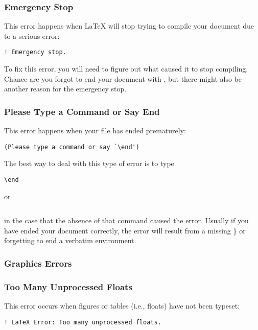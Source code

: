 \subsubsection{Emergency Stop}
\label{sec:emergency-stop}

This error happens when \LaTeX{} will stop trying to compile your
document due to a serious error:
\begin{verbatim}
! Emergency stop.
\end{verbatim}
To fix this error, you will need to figure out what caused it to stop
compiling.  Chance are you forgot to end your document with
\verb||, but there might also be another reason for the
emergency stop.

\subsubsection{Please Type a Command or Say End}
\label{sec:please-type-command}

This error happens when your file has ended prematurely:
\begin{verbatim}
(Please type a command or say `\end')
\end{verbatim}

The best way to deal with this type of error is to type
\begin{verbatim}
\end
\end{verbatim}
or
\begin{verbatim}

\end{verbatim}
in the case that the absence of that command
caused the error.  Usually if you have ended your document correctly,
the error will result from a missing \} or forgetting to end a
verbatim environment.

\subsubsection{Graphics Errors}
\label{sec:graphics-errors}

\subsubsection{Too Many Unprocessed Floats}
\label{sec:too-many-unprocessed}

This error occurs when figures or tables (i.e., floats) have not been
typeset:
\begin{verbatim}
! LaTeX Error: Too many unprocessed floats.
\end{verbatim}

